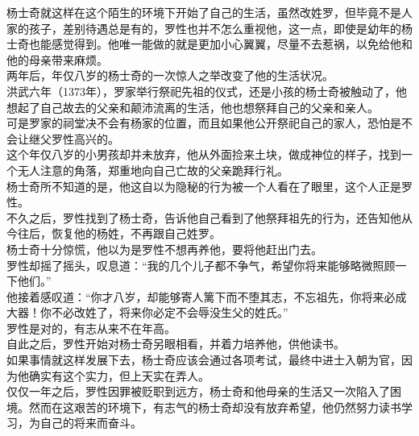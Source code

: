 \begin{multicols}{\theparacolNo}
杨士奇就这样在这个陌生的环境下开始了自己的生活，虽然改姓罗，但毕竟不是人家的孩子，差别待遇总是有的，罗性也并不怎么重视他，这一点，即使是幼年的杨士奇也能感觉得到。他唯一能做的就是更加小心翼翼，尽量不去惹祸，以免给他和他的母亲带来麻烦。\\

两年后，年仅八岁的杨士奇的一次惊人之举改变了他的生活状况。\\

洪武六年（1373年），罗家举行祭祀先祖的仪式，还是小孩的杨士奇被触动了，他想起了自己故去的父亲和颠沛流离的生活，他也想祭拜自己的父亲和亲人。\\

可是罗家的祠堂决不会有杨家的位置，而且如果他公开祭祀自己的家人，恐怕是不会让继父罗性高兴的。\\

这个年仅八岁的小男孩却并未放弃，他从外面捡来土块，做成神位的样子，找到一个无人注意的角落，郑重地向自己亡故的父亲跪拜行礼。\\

杨士奇所不知道的是，他这自以为隐秘的行为被一个人看在了眼里，这个人正是罗性。\\

不久之后，罗性找到了杨士奇，告诉他自己看到了他祭拜祖先的行为，还告知他从今往后，恢复他的杨姓，不再跟自己姓罗。\\

杨士奇十分惊慌，他以为是罗性不想再养他，要将他赶出门去。\\

罗性却摇了摇头，叹息道：“我的几个儿子都不争气，希望你将来能够略微照顾一下他们。”\\

他接着感叹道：“你才八岁，却能够寄人篱下而不堕其志，不忘祖先，你将来必成大器！你不必改姓了，将来你必定不会辱没生父的姓氏。”\\

罗性是对的，有志从来不在年高。\\

自此之后，罗性开始对杨士奇另眼相看，并着力培养他，供他读书。\\

如果事情就这样发展下去，杨士奇应该会通过各项考试，最终中进士入朝为官，因为他确实有这个实力，但上天实在弄人。\\

仅仅一年之后，罗性因罪被贬职到远方，杨士奇和他母亲的生活又一次陷入了困境。然而在这艰苦的环境下，有志气的杨士奇却没有放弃希望，他仍然努力读书学习，为自己的将来而奋斗。\\


\end{multicols}
